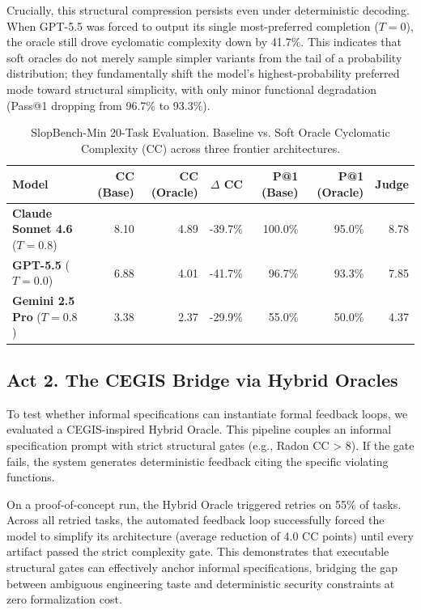 \documentclass[11pt]{article}
\begin{document}
Crucially, this structural compression persists even under deterministic decoding. When GPT-5.5 was forced to output its single most-preferred completion ($T=0$), the oracle still drove cyclomatic complexity down by 41.7\%. This indicates that soft oracles do not merely sample simpler variants from the tail of a probability distribution; they fundamentally shift the model's highest-probability preferred mode toward structural simplicity, with only minor functional degradation (Pass@1 dropping from 96.7\% to 93.3\%).

\vspace{0.1in}

\begin{table}[h]
\centering
\caption{SlopBench-Min 20-Task Evaluation. Baseline vs. Soft Oracle Cyclomatic Complexity (CC) across three frontier architectures.}
\label{tab:cross-model-comparison}
\begin{tabular}{lrrrrrr}
\hline
Model & CC (Base) & CC (Oracle) & $\Delta$ CC & P@1 (Base) & P@1 (Oracle) & Judge \\
\hline
\textbf{Claude Sonnet 4.6} ($T=0.8$) & 8.10 & 4.89 & -39.7\% & 100.0\% & 95.0\% & 8.78 \\
\textbf{GPT-5.5} ($T=0.0$) & 6.88 & 4.01 & -41.7\% & 96.7\% & 93.3\% & 7.85 \\
\textbf{Gemini 2.5 Pro} ($T=0.8$) & 3.38 & 2.37 & -29.9\% & 55.0\% & 50.0\% & 4.37 \\
\hline
\end{tabular}
\end{table}

\subsection{Act 2. The CEGIS Bridge via Hybrid Oracles}

To test whether informal specifications can instantiate formal feedback loops, we evaluated a CEGIS-inspired Hybrid Oracle. This pipeline couples an informal specification prompt with strict structural gates (e.g., Radon CC > 8). If the gate fails, the system generates deterministic feedback citing the specific violating functions.

On a proof-of-concept run, the Hybrid Oracle triggered retries on 55\% of tasks. Across all retried tasks, the automated feedback loop successfully forced the model to simplify its architecture (average reduction of 4.0 CC points) until every artifact passed the strict complexity gate. This demonstrates that executable structural gates can effectively anchor informal specifications, bridging the gap between ambiguous engineering taste and deterministic security constraints at zero formalization cost.
\end{document}
